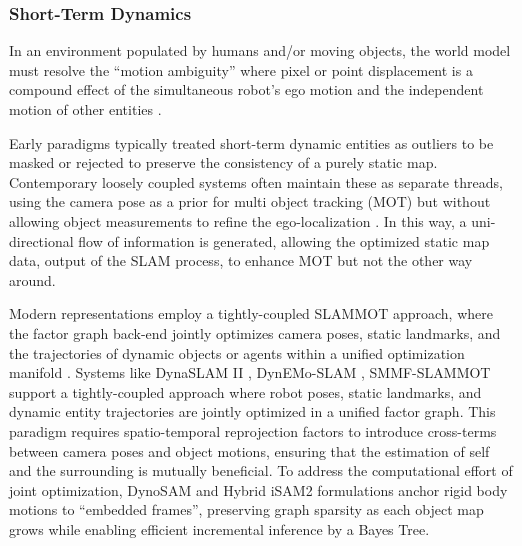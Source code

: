 \subsubsection{Short-Term Dynamics}\label{sec:dynamics_representations_agents}
In an environment populated by humans and/or moving objects, the world model must resolve the ``motion ambiguity'' where pixel or point displacement is a compound effect of the simultaneous robot's ego motion and the independent motion of other entities \cite{zhang_semantic-integrated_2026}. 

Early paradigms typically treated short-term dynamic entities as outliers to be masked or rejected \cite{bescos_dynaslam_2018} to preserve the consistency of a purely static map. 
Contemporary loosely coupled systems often maintain these as separate threads, using the camera pose as a prior for multi object tracking (MOT) but without allowing object measurements to refine the ego-localization\cite{tian_dl-slot_2024} \textcolor{red}{\cite{tian_dl-slot_2024}} \cite{gou_visual_2024}. 
In this way, a uni-directional flow of information is generated, allowing the optimized static map data, output of the SLAM process, to enhance MOT but not the other way around.

Modern representations employ a tightly-coupled SLAMMOT approach, where the factor graph back-end jointly optimizes camera poses, static landmarks, and the trajectories of dynamic objects or agents within a unified optimization manifold \cite{zhang_semantic-integrated_2026}.
Systems like DynaSLAM II \cite{bescos_dynaslam_2021}, DynEMo-SLAM \cite{giberna_dynemo-slam_2025}, SMMF-SLAMMOT \cite{zhang_semantic-integrated_2026} support a tightly-coupled approach where robot poses, static landmarks, and dynamic entity trajectories are jointly optimized in a unified factor graph.
This paradigm requires spatio-temporal reprojection factors to introduce cross-terms between camera poses and object motions, ensuring that the estimation of self and the surrounding is mutually beneficial. 
To address the computational effort of joint optimization, DynoSAM\cite{morris_dynosam_2025} and Hybrid iSAM2 \cite{morris_online_2025} formulations anchor rigid body motions to ``embedded frames'', preserving graph sparsity as each object map grows while enabling efficient incremental inference by a Bayes Tree. 

